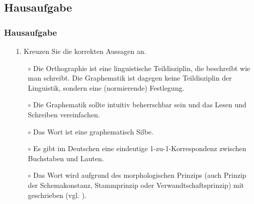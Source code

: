 \subsection{Hausaufgabe}
%
%
%	
%			
%			
%
%

\begin{frame}%
	\frametitle{Hausaufgabe}
	
\begin{itemize}
	
	\item[1.] Kreuzen Sie die korrekten Aussagen an.
	
	\begin{itemize}
		\item[$\circ$] Die Orthographie ist eine linguistische Teildisziplin, die beschreibt wie man schreibt. Die Graphematik ist dagegen keine Teildisziplin der Linguistik, sondern eine  (normierende) Festlegung.
		\item[$\circ$] Die Graphematik sollte intuitiv beherrschbar sein und das Lesen und Schreiben vereinfachen.
		\item[$\circ$] Das Wort  ist eine graphematisch  Silbe.
		\item[$\circ$] Es gibt im Deutschen eine eindeutige 1-zu-1-Korrespondenz zwischen Buchstaben und Lauten.
		\item[$\circ$] Das Wort  wird aufgrund des morphologischen Prinzips (auch Prinzip der Schemakonstanz, Stammprinzip oder Verwandtschaftsprinzip) mit  geschrieben (vgl. ).
	\end{itemize}
\end{itemize}
\end{frame}


